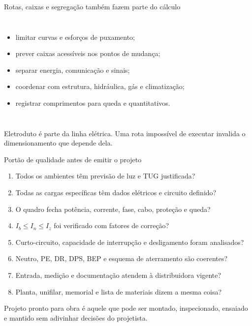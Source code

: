 \begin{frame}{Rotas, caixas e segregação também fazem parte do cálculo}
\small
\begin{columns}[T,onlytextwidth]
\begin{itemize}
\item limitar curvas e esforços de puxamento;
\item prever caixas acessíveis nos pontos de mudança;
\item separar energia, comunicação e sinais;
\item coordenar com estrutura, hidráulica, gás e climatização;
\item registrar comprimentos para queda e quantitativos.
\end{itemize}
\end{columns}
\begin{caixaAt}
Eletroduto é parte da linha elétrica. Uma rota impossível de executar invalida o dimensionamento que depende dela.
\end{caixaAt}
\end{frame}

\begin{frame}{Portão de qualidade antes de emitir o projeto}
\small
\begin{enumerate}
\item Todos os ambientes têm previsão de luz e TUG justificada?
\item Todas as cargas específicas têm dados elétricos e circuito definido?
\item O quadro fecha potência, corrente, fase, cabo, proteção e queda?
\item $I_b\leq I_n\leq I_z$ foi verificado com fatores de correção?
\item Curto-circuito, capacidade de interrupção e desligamento foram analisados?
\item Neutro, PE, DR, DPS, BEP e esquema de aterramento são coerentes?
\item Entrada, medição e documentação atendem à distribuidora vigente?
\item Planta, unifilar, memorial e lista de materiais dizem a mesma coisa?
\end{enumerate}
\begin{caixaProjeto}
Projeto pronto para obra é aquele que pode ser montado, inspecionado, ensaiado e mantido sem adivinhar decisões do projetista.
\end{caixaProjeto}
\end{frame}

